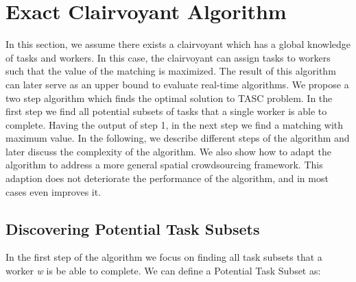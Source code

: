 \section{Exact Clairvoyant Algorithm}
\label{sec:exactalgo}



In this section, we assume there exists a clairvoyant which has a global knowledge of tasks and workers. In this case, the clairvoyant can assign tasks to workers such that the value of the matching is maximized. The result of this algorithm can later serve as an upper bound to evaluate real-time algorithms. We propose a two step algorithm which finds the optimal solution to TASC problem. In the first step we find all potential subsets of tasks that a single worker is able to complete. Having the output of step 1, in the next step we find a matching with maximum value. In the following, we describe different steps of the algorithm and later discuss the complexity of the algorithm. We also show how to adapt the algorithm to address a more general spatial crowdsourcing framework. This adaption does not deteriorate the performance of the algorithm, and in most cases even improves it.

\subsection{Discovering Potential Task Subsets}
\label{subsec:FindPTS}
In the first step of the algorithm we focus on finding all task subsets that a worker \emph{w} is be able to complete. We can define a Potential Task Subset as:

